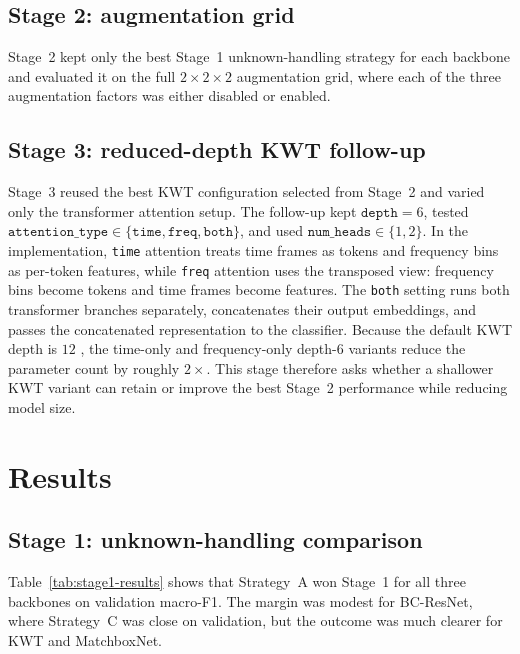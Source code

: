 \documentclass[11pt]{article}
\begin{document}
\subsection*{Stage 2: augmentation grid}
Stage~2 kept only the best Stage~1 unknown-handling strategy for each backbone and evaluated it on the full \(2\times2\times2\) augmentation grid, where each of the three augmentation factors was either disabled or enabled.




\subsection*{Stage 3: reduced-depth KWT follow-up}
Stage~3 reused the best KWT configuration selected from Stage~2 and varied only the transformer attention setup. The follow-up kept \(\texttt{depth}=6\), tested \(\texttt{attention\_type}\in\{\texttt{time}, \texttt{freq}, \texttt{both}\}\), and used \(\texttt{num\_heads}\in\{1,2\}\). In the implementation, \texttt{time} attention treats time frames as tokens and frequency bins as per-token features, while \texttt{freq} attention uses the transposed view: frequency bins become tokens and time frames become features. The \texttt{both} setting runs both transformer branches separately, concatenates their output embeddings, and passes the concatenated representation to the classifier. Because the default KWT depth is \(12\) \cite{kwt}, the time-only and frequency-only depth-\(6\) variants reduce the parameter count by roughly \(2\times\). This stage therefore asks whether a shallower KWT variant can retain or improve the best Stage~2 performance while reducing model size.


\section{Results}
\label{sec:results}
\subsection*{Stage 1: unknown-handling comparison}
Table~\ref{tab:stage1-results} shows that Strategy~A won Stage~1 for all three backbones on validation macro-F1. The margin was modest for BC-ResNet, where Strategy~C was close on validation, but the outcome was much clearer for KWT and MatchboxNet. 
\end{document}
